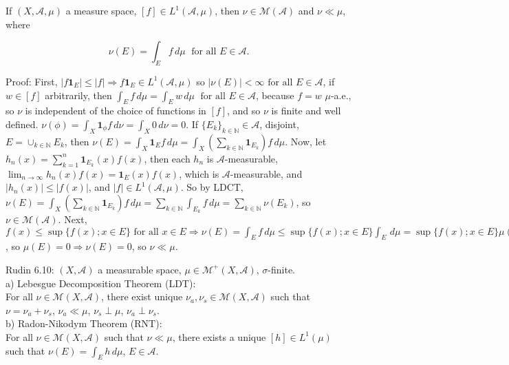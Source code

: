 \documentclass[12pt]{article}
\newcommand{\fall}[0] { \textrm{ for all } }
\newcommand{\rimply}[0] { \Rightarrow }
\newcommand{\rarw}[0] { \rightarrow }
\newcommand{ \cf }[1] { \mathbf{1}_{#1} }
\newcommand{\nats}[0] { \mathbb{N}}
\newcommand{\A}[0] { \mathcal{A} }
\newcommand{\M}[0] { \mathcal{M} }
\begin{document}

If $(X, \A, \mu)$ a measure space, $[f] \in L^1(\A,\mu)$, then $\nu \in \M(\A)$ and $\nu \ll \mu$, where

$$ \nu(E) = \int_E f \, d\mu \; \fall E \in \A.$$

\noindent
Proof: First, $|f \cf{E}| \le |f| \rimply f \cf{E} \in  L^1(\A,\mu)$ so $|\nu(E)| < \infty \fall E \in \A$, if $w \in [f]$ arbitrarily, then $\int_E f \, d\mu = \int_E w \, d\mu  \; \fall E \in \A $, because $f = w$ $\mu$-a.e., so $\nu$ is independent of the choice of functions in $[f]$, and so $\nu$ is finite and well defined. $\nu(\phi) = \int_X \cf{\phi} f \, d\nu = \int_X 0 \, d\nu = 0$. If $\{ E_k \}_{k \in \nats} \in \A$, disjoint, $E  = \cup_{k \in \nats} E_k$, then $\nu(E) = \int_X \cf{E} f \, d\mu = \int_X ( \sum_{k \in \nats} \cf{E_k} ) f \, d\mu$. Now, let $h_n(x) = \sum_{k=1}^n \cf{E_k}(x) f(x)$, then each $h_n$ is $\A$-measurable, $\lim_{n \rarw \infty} h_n(x) f(x) = \cf{E}(x) f(x)$, which is $\A$-measurable, and $|h_n(x)| \le |f(x)|$, and $|f| \in L^1(\A, \mu)$. So by LDCT, $\nu(E) = \int_X ( \sum_{k \in \nats} \cf{E_k} ) f \, d\mu  =  \sum_{k \in \nats} \int_{E_k}  f \, d\mu = \sum_{k \in \nats} \nu(E_k)$, so $\nu \in \M(\A)$. Next, $f(x) \le \sup \{ f(x); x \in E \} \fall x \in E \rimply \nu(E) = \int_E f \, d\mu \le \sup \{ f(x); x \in E \} \int_E \, d\mu = \sup \{ f(x); x \in E \} \mu(E)$, so $\mu(E) = 0 \rimply \nu(E) = 0$, so $\nu \ll \mu$.









\break

Rudin 6.10: $(X, \A)$ a measurable space, $\mu \in \M^+(X, \A)$, $\sigma$-finite. \\

\noindent 
a) Lebesgue Decomposition Theorem (LDT): \\

\noindent 
For all $\nu \in \M(X, \A)$, there exist unique $\nu_a, \nu_s \in \M(X, \A)$ such that $\nu = \nu_a + \nu_s$, $\nu_a \ll \mu$, $\nu_s \perp \mu$, $\nu_a \perp \nu_s$. \\

\noindent 
b) Radon-Nikodym Theorem (RNT): \\

\noindent 
For all $\nu \in \M(X, \A)$ such that $\nu \ll \mu$, there exists a unique $[h] \in L^1(\mu)$ such that $ \nu(E) = \int_E h \, d\mu $, $E \in \A$. \\
\end{document}
